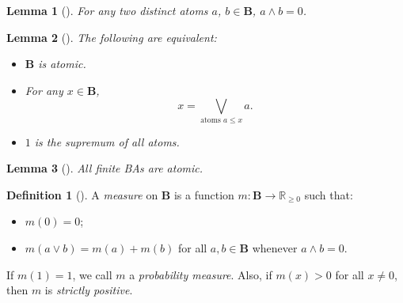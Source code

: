 \documentclass{article}
\newtheorem{lemma}{Lemma}
\theoremstyle{definition}
\newtheorem{definition}{Definition}
\theoremstyle{remark}
\begin{document}
\begin{lemma}[\cite{ganesh2006introduction}]
  For any two distinct atoms $a$, $b \in \mathbf{B}$, $a \land b = 0$.
\end{lemma}

\begin{lemma}[\cite{givant2008introduction}] \label{thm:representation}
  The following are equivalent:
  \begin{itemize}
  \item $\mathbf{B}$ is atomic.
  \item For any $x \in \mathbf{B}$,
    \[
      x = \bigvee_{\text{atoms } a \le x} a.
    \]
  \item $1$ is the supremum of all atoms.
  \end{itemize}
\end{lemma}

\begin{lemma}[\cite{givant2008introduction}] \label{lemma:atomic}
  All finite BAs are atomic.
\end{lemma}

\begin{definition}[\cite{gaifman1964concerning,DBLP:books/daglib/0090259}] \label{def:measure}
  A \emph{measure} on $\mathbf{B}$ is a function $m\colon
  \mathbf{B} \to \mathbb{R}_{\ge 0}$ such that:
  \begin{itemize}
  \item $m(0) = 0$;
  \item $m(a \lor b) = m(a) + m(b)$ for all $a, b \in \mathbf{B}$ whenever $a
    \land b = 0$.
  \end{itemize}
  If $m(1) = 1$, we call $m$ a \emph{probability measure}. Also, if $m(x) > 0$
  for all $x \ne 0$, then $m$ is \emph{strictly positive}.
\end{definition}

\end{document}

